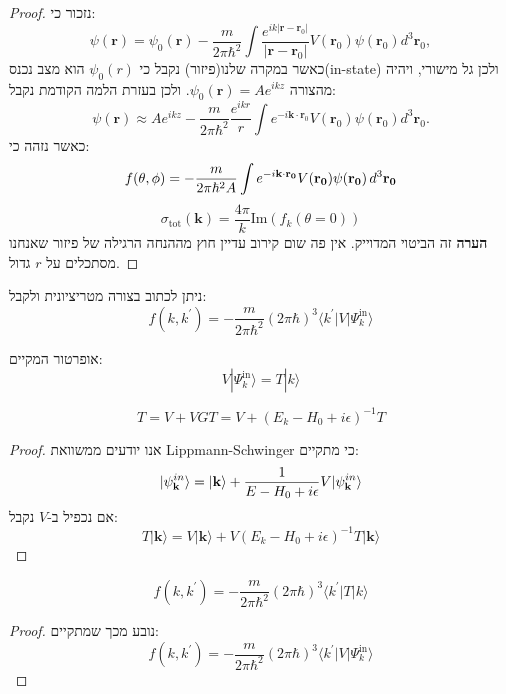 \documentclass{tstextbook}
\begin{document}
\begin{proof}
נזכור כי:
$$\psi\left(\mathbf{r}\right)=\psi_{0}(\mathbf{r})-{\frac{m}{2\pi\hbar^{2}}}\int{\frac{e^{i k\left|\mathbf{r}-\mathbf{r}_{0}\right|}}{\left|\mathbf{r}-\mathbf{r}_{0}\right|}}V(\mathbf{r}_{0})\psi\left(\mathbf{r}_{0}\right)d^{3}\mathbf{r}_{0},$$
כאשר במקרה שלנו(פיזור) נקבל כי \(\psi_{0}(r)\) הוא מצב נכנס(in-state) ולכן גל מישורי, ויהיה מהצורה \(\psi_{0}\left( \mathbf{r} \right)=Ae^{ ikz }\). ולכן בעזרת הלמה הקודמת נקבל:
$$\psi\left(\mathbf{r}\right)\approx A e^{i k z}-\frac{m}{2\pi\hbar^{2}}\frac{e^{i k r}}{r}\int e^{-i\mathbf{k}\cdot\mathbf{r}_{0}}V\left(\mathbf{r}_{0}\right)\psi\left(\mathbf{r}_{0}\right)d^{3}\mathbf{r}_{0}.$$
כאשר נזהה כי:
$$f(\theta,\phi)=-\frac{m}{2\pi\hbar^{2}A}\int e^{-i{\bf k\cdot r_{0}}}V({\bf r_{0}})\psi({\bf r_{0}})\,d^{3}{\bf r_{0}}$$$$\sigma_{\text{tot}}\left( \mathbf{k} \right)=\frac{4\pi}{k}\mathrm{Im}\left( f_{k}\left( \theta=0 \right) \right)$$\textbf{הערה}
זה הביטוי המדוייק. אין פה שום קירוב עדיין חוץ מההנחה הרגילה של פיזור שאנחנו מסתכלים על \(r\) גדול.

\end{proof}
\begin{corollary}
ניתן לכתוב בצורה מטריציונית ולקבל:
$$f(k,k^{\prime})=-\frac{m}{2\pi\hbar^{2}}(2\pi\hbar)^{3}\langle k^{\prime}|V|\Psi_{k}^{\mathrm{in}}\rangle$$

\end{corollary}
\begin{definition}[אופרטור T]
אופרטור המקיים:
$$V|\Psi_{k}^{\mathrm{in}}\rangle=T|k\rangle$$

\end{definition}
\begin{corollary}
$$T=V+VGT=V+\left(E_{k}-H_{0}+i\epsilon\right)^{-1}T$$

\end{corollary}
\begin{proof}
אנו יודעים ממשוואת Lippmann-Schwinger כי מתקיים:
$$|\psi_{\bf k}^{i n}\rangle=|{\bf k}\rangle+\frac{1}{E-H_{0}+i\epsilon}V|\psi_{\bf k}^{i n}\rangle$$
אם נכפיל ב-\(V\) נקבל:
$$T|\mathbf{k}\rangle=V|\mathbf{k}\rangle+V\left(E_{k}-H_{0}+i\epsilon\right)^{-1}T|\mathbf{k}\rangle$$

\end{proof}
\begin{corollary}
$$f(k,k^{\prime})=-\frac{m}{2\pi\hbar^{2}}(2\pi\hbar)^{3}\langle k^{\prime}|T|k\rangle$$

\end{corollary}
\begin{proof}
נובע מכך שמתקיים:
$$f(k,k^{\prime})=-\frac{m}{2\pi\hbar^{2}}(2\pi\hbar)^{3}\langle k^{\prime}|V|\Psi_{k}^{\mathrm{in}}\rangle$$

\end{proof}
\end{document}
